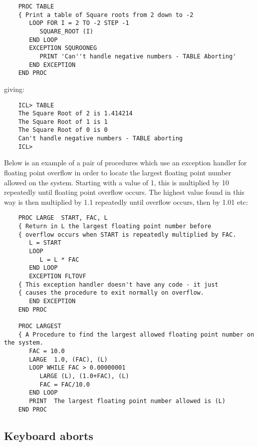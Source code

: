 \begin{small}
\begin{verbatim}
    PROC TABLE
    { Print a table of Square roots from 2 down to -2
       LOOP FOR I = 2 TO -2 STEP -1
          SQUARE_ROOT (I)
       END LOOP
       EXCEPTION SQUROONEG
          PRINT 'Can''t handle negative numbers - TABLE Aborting'
       END EXCEPTION
    END PROC
\end{verbatim}
\end{small}

giving:

\begin{small}
\begin{verbatim}
    ICL> TABLE
    The Square Root of 2 is 1.414214
    The Square Root of 1 is 1
    The Square Root of 0 is 0
    Can't handle negative numbers - TABLE aborting
    ICL>
\end{verbatim}
\end{small}

Below is an example of a pair of procedures which use an exception handler for
floating point overflow in order to locate the largest floating point number
allowed on the system.
Starting with a value of 1, this is multiplied by 10 repeatedly until floating
point overflow occurs.
The highest value found in this way is then multiplied by 1.1 repeatedly until
overflow occurs, then by 1.01 etc:

\begin{small}
\begin{verbatim}
    PROC LARGE  START, FAC, L
    { Return in L the largest floating point number before
    { overflow occurs when START is repeatedly multiplied by FAC.
       L = START
       LOOP
          L = L * FAC
       END LOOP
       EXCEPTION FLTOVF
    { This exception handler doesn't have any code - it just
    { causes the procedure to exit normally on overflow.
       END EXCEPTION
    END PROC

    PROC LARGEST
    { A Procedure to find the largest allowed floating point number on the system.
       FAC = 10.0
       LARGE  1.0, (FAC), (L)
       LOOP WHILE FAC > 0.00000001
          LARGE (L), (1.0+FAC), (L)
          FAC = FAC/10.0
       END LOOP
       PRINT  The largest floating point number allowed is (L)
    END PROC
\end{verbatim}
\end{small}


\subsection{Keyboard aborts}

